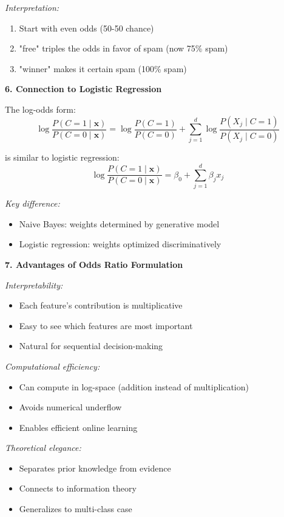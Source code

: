 \documentclass[12pt]{article}
\begin{document}
\begin{explanation}
\textit{Interpretation:}
\begin{enumerate}
    \item Start with even odds (50-50 chance)
    \item "free" triples the odds in favor of spam (now 75\% spam)
    \item "winner" makes it certain spam (100\% spam)
\end{enumerate}

\textbf{6. Connection to Logistic Regression}

The log-odds form:
\[
\log \frac{P(C=1 \mid \mathbf{x})}{P(C=0 \mid \mathbf{x})} = \log \frac{P(C=1)}{P(C=0)} + \sum_{j=1}^{d} \log \frac{P(X_j \mid C=1)}{P(X_j \mid C=0)}
\]

is similar to logistic regression:
\[
\log \frac{P(C=1 \mid \mathbf{x})}{P(C=0 \mid \mathbf{x})} = \beta_0 + \sum_{j=1}^{d} \beta_j x_j
\]

\textit{Key difference:}
\begin{itemize}
    \item Naive Bayes: weights determined by generative model
    \item Logistic regression: weights optimized discriminatively
\end{itemize}

\textbf{7. Advantages of Odds Ratio Formulation}

\textit{Interpretability:}
\begin{itemize}
    \item Each feature's contribution is multiplicative
    \item Easy to see which features are most important
    \item Natural for sequential decision-making
\end{itemize}

\textit{Computational efficiency:}
\begin{itemize}
    \item Can compute in log-space (addition instead of multiplication)
    \item Avoids numerical underflow
    \item Enables efficient online learning
\end{itemize}

\textit{Theoretical elegance:}
\begin{itemize}
    \item Separates prior knowledge from evidence
    \item Connects to information theory
    \item Generalizes to multi-class case
\end{itemize}


\end{explanation}
\end{document}
